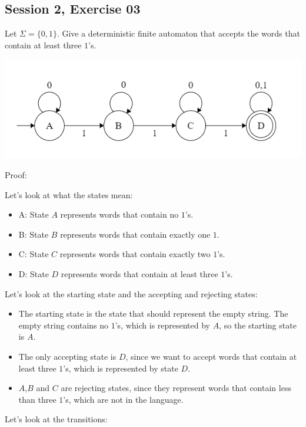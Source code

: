 \subsection{Session 2, Exercise 03}


Let $\Sigma=\{0,1\}$. Give a deterministic finite automaton that accepts the words that contain at least three $1$'s.



\includegraphics[width=0.6\linewidth]{02/2_3.png}

Proof:

Let's look at what the states mean:

\begin{itemize}
    \item A: State $A$ represents words that contain no $1$'s.
    \item B: State $B$ represents words that contain exactly one $1$.
    \item C: State $C$ represents words that contain exactly two  $1$'s.
    \item D: State $D$ represents words that contain at least three  $1$'s.
\end{itemize}

Let's look at the starting state and the accepting and rejecting states:

\begin{itemize}
    \item The starting state is the state that should represent the empty string. The empty string contains no $1$'s, which is represented by $A$, so the starting state is $A$.
    \item The only accepting state is $D$, since we want to accept words that contain at least three $1$'s, which is represented by state $D$.
    \item $A$,$B$ and $C$ are rejecting states, since they represent words that contain less than three $1$'s, which are not in the language.
\end{itemize}

Let's look at the transitions:

